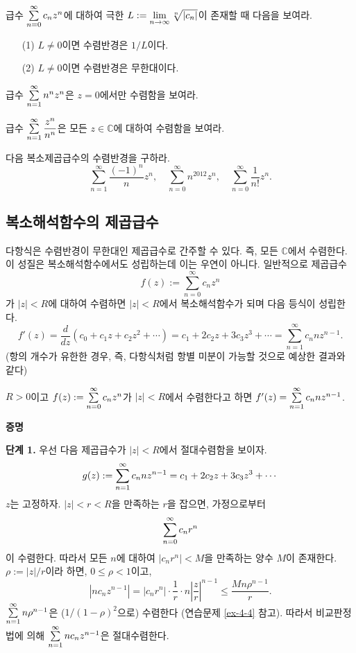 \begin{salt_exercise}\label{ex-4-6}
급수 $\sum\limits_{n=0}^\infty c_nz^n$에 대하여
극한 $L:=\lim\limits_{n\to\infty} \sqrt[n]{|c_n|}$이 존재할 때
다음을 보여라.
\begin{itemize}
\item[(1)] $L\ne 0$이면 수렴반경은 $1/L$이다.
\item[(2)] $L\ne0$이면 수렴반경은 무한대이다.
\end{itemize}
\end{salt_exercise}

\begin{salt_exercise}\label{ex-4-7}
급수 $\sum\limits_{n=1}^\infty n^nz^n$은
$z=0$에서만 수렴함을 보여라.
\end{salt_exercise}

\begin{salt_exercise}\label{ex-4-8}
급수 $\sum\limits_{n=1}^\infty \displaystyle\frac{z^n}{n^n}$은
모든 $z\in\mathbb C$에 대하여 수렴함을 보여라.
\end{salt_exercise}

\begin{salt_exercise}\label{ex-4-9}
다음 복소제곱급수의 수렴반경을 구하라.
\[
\sum_{n=1}^\infty \dfrac{(-1)^n}{n}z^n,\quad
\sum_{n=0}^\infty n^{2012}z^n, \quad
\sum_{n=0}^\infty \dfrac1{n!}z^n.
\]
\end{salt_exercise}

\subsection{복소해석함수의 제곱급수}

다항식은 수렴반경이 무한대인 제곱급수로 간주할 수 있다.
즉, 모든 $\mathbb C$에서 수렴한다.
이 성질은 복소해석함수에서도 성립하는데
이는 우연이 아니다.
일반적으로 제곱급수 
\[
f(z):= \sum_{n=0}^\infty c_nz^n
\]
가 $|z|<R$에 대하여 수렴하면
$|z|<R$에서 복소해석함수가 되며 
다음 등식이 성립한다.
\[
f'(z) = \dfrac d{dz} (c_0+ c_1z + c_2z^2 + \cdots)
= c_1 + 2c_2z + 3c_3z^3 + \cdots 
= \sum_{n=1}^\infty c_n n z^{n-1}.
\]
(항의 개수가 유한한 경우, 즉, 다항식처럼 
항별 미분이 가능할 것으로 예상한 결과와 같다)

\begin{salttheorem}{}{} \label{thm-4-3}
$R>0$이고 $f(z):= \sum\limits_{n=0}^\infty c_nz^n$가
$|z|<R$에서 수렴한다고 하면
$f'(z) = \sum\limits_{n=1}^\infty c_n n z^{n-1}$.
\end{salttheorem}

{\bf 증명}

{\bf 단계 1.}
우선 다음 제곱급수가 $|z|<R$에서 절대수렴함을 보이자.
\[
g(z):= \sum\limits_{n=1}^\infty c_n n z^{n-1}
=  c_1 + 2c_2z + 3c_3z^3 + \cdots
\]
$z$는 고정하자.
$|z|<r<R$을 만족하는 $r$을 잡으면, 가정으로부터
\[
\sum\limits_{n=0}^\infty c_nr^n
\]
이 수렴한다. 따라서 모든 $n$에 대하여
$|c_nr^n|<M$을 만족하는 양수 $M$이 존재한다.
$\rho:=|z|/r$이라 하면, $0\le \rho <1$이고,
\[
|nc_nz^{n-1}| = |c_nr^n| \cdot 
\dfrac1r \cdot n \left| \dfrac zr\right|^{n-1}
\le \dfrac{Mn\rho^{n-1}}r.
\]
$\sum\limits_{n=1}^\infty n\rho^{n-1}$은 
($1/(1-\rho)^2$으로) 수렴한다 (연습문제 \ref{ex-4-4} 참고).
따라서 비교판정법에 의해
$\sum\limits_{n=1}^\infty nc_nz^{n-1}$은 절대수렴한다.

